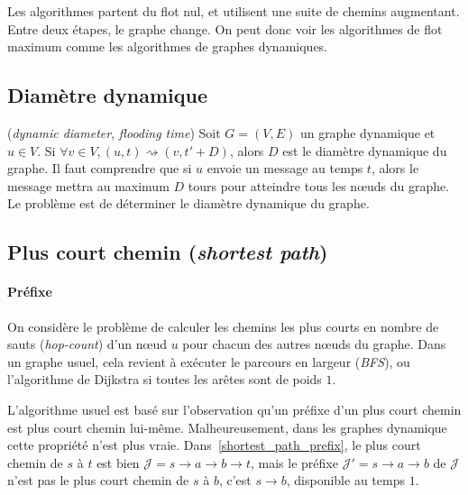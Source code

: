 \documentclass[12pt,a4paper]{article}
\begin{document}
Les algorithmes partent du flot nul, et utilisent une suite de chemins
augmentant. Entre deux étapes, le graphe change. On peut donc voir les
algorithmes de flot maximum comme les algorithmes de graphes
dynamiques.

\subsection{Diamètre dynamique}
(\textit{dynamic diameter}, \textit{flooding time}) Soit
\(G = (V, E)\) un graphe dynamique et \(u \in V\). Si
\(\forall v \in V, (u, t) \rightsquigarrow (v, t' + D)\), alors \(D\)
est le diamètre dynamique du graphe. Il faut comprendre que si \(u\)
envoie un message au temps \(t\), alors le message mettra au maximum
\(D\) tours pour atteindre tous les nœuds du graphe. Le problème est
de déterminer le diamètre dynamique du graphe.

\subsection{Plus court chemin (\textit{shortest path})}

\paragraph{Préfixe}
On considère le problème de calculer les chemins les plus courts en
nombre de sauts (\textit{hop-count}) d'un nœud \(u\) pour chacun des
autres nœuds du graphe. Dans un graphe usuel, cela revient à exécuter
le parcours en largeur (\textit{BFS}), ou l'algorithme de Dijkstra si
toutes les arêtes sont de poids \(1\).

L'algorithme usuel est basé sur l'observation qu'un préfixe d'un plus
court chemin est plus court chemin lui-même. Malheureusement, dans les
graphes dynamique cette propriété n'est plus
vraie. Dans~\ref{shortest_path_prefix}, le plus court chemin de \(s\)
à \(t\) est bien
\(\mathcal{J} = s \rightarrow a \rightarrow b \rightarrow t\), mais le
préfixe \(\mathcal{J'} = s \rightarrow a \rightarrow b\) de
\(\mathcal{J}\) n'est pas le plus court chemin de \(s\) à \(b\), c'est
\(s \rightarrow b\), disponible au temps \(1\).
\end{document}
